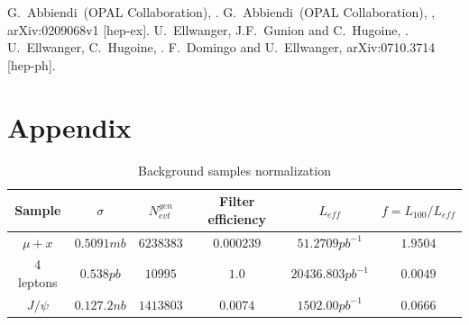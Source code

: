 \documentclass[aps,12pt,superscriptaddress,nofootinbib,floatfix,showpacs]{revtex4}
\begin{document}
\begin{thebibliography}{99}
 G.~Abbiendi~\etal (OPAL Collaboration), .
 G.~Abbiendi~\etal (OPAL Collaboration), , arXiv:0209068v1 [hep-ex].
 U.~Ellwanger, J.F.~Gunion and C.~Hugoine, .
 U.~Ellwanger, C.~Hugoine, .
 F.~Domingo and U.~Ellwanger, arXiv:0710.3714 [hep-ph].




%
%

    
\end{thebibliography}

\section{Appendix}


\begin{table}[t]
\caption{Background samples normalization\label{bckgr_normalize}}
\begin{center}
\begin{tabular}{|c|c|c|c|c|c|}
\hline
Sample & $\sigma$ & $N^{gen}_{evt}$ & Filter efficiency & $L_{eff}$ & $f = L_{100}/L_{eff}$ \\ \hline
$\mu+x$ &           $0.5091mb$    &    $6238383$      &    $0.000239$  &  $51.2709pb^{-1}$   &  $1.9504$ \\ \hline
4 leptons &        $0.538pb$     &    $10995$        &    $1.0$       &  $20436.803pb^{-1}$ &  $0.0049$ \\ \hline
$J/\psi$ &         $0.127.2nb$   &    $1413803$      &    $0.0074$    &  $1502.00pb^{-1}$   &  $0.0666$ \\ \hline

\end{tabular}
\end{center}
\end{table}
\end{document}
